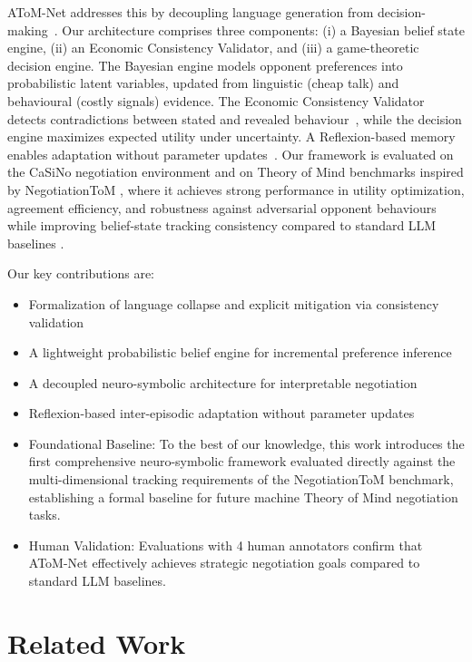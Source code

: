 \documentclass[11pt]{article}
\begin{document}
AToM-Net addresses this by decoupling language generation from decision-making~\cite{decoupling}. Our architecture comprises three components: (i) a Bayesian belief state engine, (ii) an Economic Consistency Validator, and (iii) a game-theoretic decision engine. The Bayesian engine models opponent preferences into probabilistic latent variables, updated from linguistic (cheap talk) and behavioural (costly signals) evidence. The Economic Consistency Validator detects contradictions between stated and revealed behaviour~\cite{deception}, while the decision engine maximizes expected utility under uncertainty. A Reflexion-based memory enables adaptation without parameter updates~\cite{reflexion}. Our framework is evaluated on the CaSiNo negotiation environment \cite{casino} and on Theory of Mind benchmarks inspired by NegotiationToM \cite{negotiationtom}, where it achieves strong performance in utility optimization, agreement efficiency, and robustness against adversarial opponent behaviours while improving belief-state tracking consistency compared to standard LLM baselines \cite{bargainingeval,sidconarena2026,selfdriving2026}.

Our key contributions are:
\begin{itemize}
\item Formalization of language collapse and explicit mitigation via consistency validation
\item A lightweight probabilistic belief engine for incremental preference inference
\item A decoupled neuro-symbolic architecture for interpretable negotiation
\item Reflexion-based inter-episodic adaptation without parameter updates
\item Foundational Baseline: To the best of our knowledge, this work introduces the first comprehensive neuro-symbolic framework evaluated directly against the multi-dimensional tracking requirements of the NegotiationToM benchmark, establishing a formal baseline for future machine Theory of Mind negotiation tasks.
\item Human Validation: Evaluations with 4 human annotators confirm that AToM-Net effectively achieves strategic negotiation goals compared to standard LLM baselines.
\end{itemize}

\section{Related Work}
\end{document}
